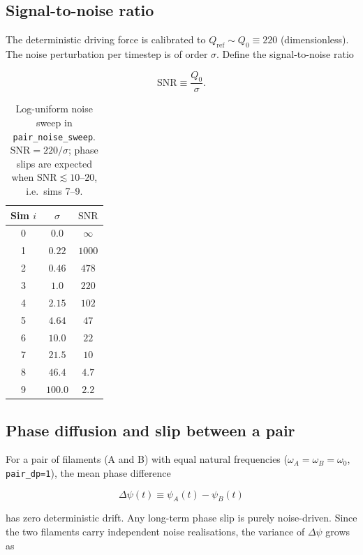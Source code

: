 \documentclass[11pt,a4paper]{article}
\begin{document}
\subsection{Signal-to-noise ratio}

The deterministic driving force is calibrated to
$Q_{\text{ref}} \sim Q_0 \equiv 220$ (dimensionless).  The noise
perturbation per timestep is of order $\sigma$.  Define the signal-to-noise
ratio

\begin{equation}
  \mathrm{SNR} \equiv \frac{Q_0}{\sigma}.
\end{equation}

\begin{table}[h]
\centering
\begin{tabular}{ccc}
\toprule
Sim $i$ & $\sigma$ & $\mathrm{SNR}$ \\
\midrule
0 & $0.0$    & $\infty$ \\
1 & $0.22$   & $1000$ \\
2 & $0.46$   & $478$ \\
3 & $1.0$    & $220$ \\
4 & $2.15$   & $102$ \\
5 & $4.64$   & $47$ \\
6 & $10.0$   & $22$ \\
7 & $21.5$   & $10$ \\
8 & $46.4$   & $4.7$ \\
9 & $100.0$  & $2.2$ \\
\bottomrule
\end{tabular}
\caption{Log-uniform noise sweep in \texttt{pair\_noise\_sweep}.
$\mathrm{SNR} = 220/\sigma$; phase slips are expected when $\mathrm{SNR}
\lesssim 10$--$20$, i.e.\ sims 7--9.}
\end{table}

\subsection{Phase diffusion and slip between a pair}

For a pair of filaments (A and B) with equal natural frequencies
($\omega_A = \omega_B = \omega_0$, \texttt{pair\_dp=1}), the mean phase
difference

\begin{equation}
  \Delta\psi(t) \equiv \psi_A(t) - \psi_B(t)
\end{equation}

has zero deterministic drift.  Any long-term phase slip is purely
noise-driven.  Since the two filaments carry independent noise realisations,
the variance of $\Delta\psi$ grows as
\end{document}
